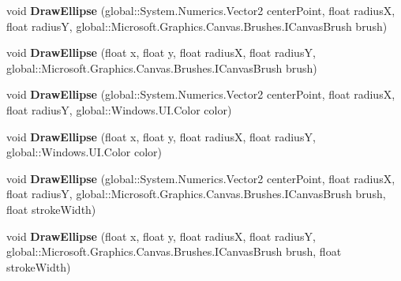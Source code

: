 \begin{DoxyCompactItemize}
\item 
\mbox{\label{interface_microsoft_1_1_graphics_1_1_canvas_1_1_i_canvas_drawing_session_a8d23860e99bbdc73d66a986215651b87}} 
void {\bfseries Draw\+Ellipse} (global\+::\+System.\+Numerics.\+Vector2 center\+Point, float radiusX, float radiusY, global\+::\+Microsoft.\+Graphics.\+Canvas.\+Brushes.\+I\+Canvas\+Brush brush)
\item 
\mbox{\label{interface_microsoft_1_1_graphics_1_1_canvas_1_1_i_canvas_drawing_session_ad948689f5f475e1265bfd6bd1b6d31f9}} 
void {\bfseries Draw\+Ellipse} (float x, float y, float radiusX, float radiusY, global\+::\+Microsoft.\+Graphics.\+Canvas.\+Brushes.\+I\+Canvas\+Brush brush)
\item 
\mbox{\label{interface_microsoft_1_1_graphics_1_1_canvas_1_1_i_canvas_drawing_session_afc25b02c2240132004eb075a6f12006a}} 
void {\bfseries Draw\+Ellipse} (global\+::\+System.\+Numerics.\+Vector2 center\+Point, float radiusX, float radiusY, global\+::\+Windows.\+U\+I.\+Color color)
\item 
\mbox{\label{interface_microsoft_1_1_graphics_1_1_canvas_1_1_i_canvas_drawing_session_a6cdb8e5f737e4475a85335ee9d17d397}} 
void {\bfseries Draw\+Ellipse} (float x, float y, float radiusX, float radiusY, global\+::\+Windows.\+U\+I.\+Color color)
\item 
\mbox{\label{interface_microsoft_1_1_graphics_1_1_canvas_1_1_i_canvas_drawing_session_a8e7eae25b784a8eef3dfc6e6cc77180d}} 
void {\bfseries Draw\+Ellipse} (global\+::\+System.\+Numerics.\+Vector2 center\+Point, float radiusX, float radiusY, global\+::\+Microsoft.\+Graphics.\+Canvas.\+Brushes.\+I\+Canvas\+Brush brush, float stroke\+Width)
\item 
\mbox{\label{interface_microsoft_1_1_graphics_1_1_canvas_1_1_i_canvas_drawing_session_a3c49f5eafa426013a87599137c98c37d}} 
void {\bfseries Draw\+Ellipse} (float x, float y, float radiusX, float radiusY, global\+::\+Microsoft.\+Graphics.\+Canvas.\+Brushes.\+I\+Canvas\+Brush brush, float stroke\+Width)

\end{DoxyCompactItemize}
